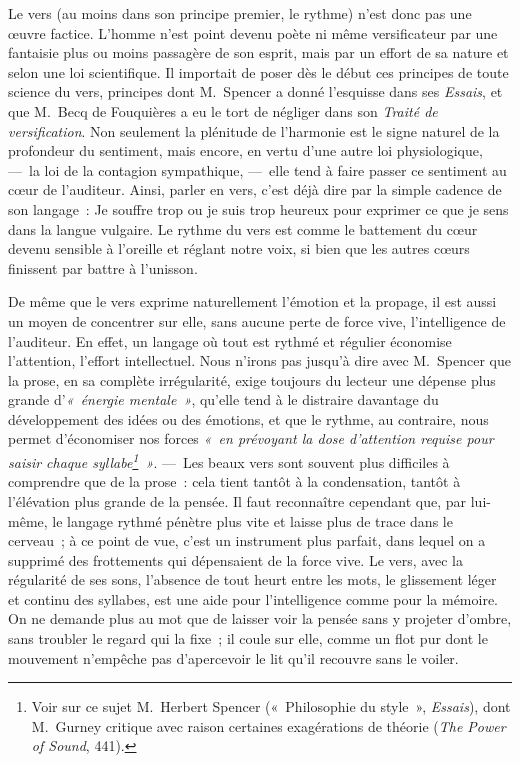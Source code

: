 \documentclass[french,twoside]{book} %
\begin{document}
Le vers (au moins dans son principe premier, le rythme) n’est donc pas une œuvre factice. L’homme n’est point devenu poète ni même versificateur par une fantaisie plus ou moins passagère de son esprit, mais par un effort de sa nature et selon une loi scientifique. Il importait de poser dès le début ces principes de toute science du vers, principes dont M. Spencer a donné l’esquisse dans ses \emph{Essais}, et que M. Becq de Fouquières a eu le tort de négliger dans son \emph{Traité de versification}. Non seulement la plénitude de l’harmonie est le signe naturel de la profondeur du sentiment, mais encore, en vertu d’une autre loi physiologique,  — la loi de la contagion sympathique, — elle tend à faire passer ce sentiment au cœur de l’auditeur. Ainsi, parler en vers, c’est déjà dire par la simple cadence de son langage : Je souffre trop ou je suis trop heureux pour exprimer ce que je sens dans la langue vulgaire. Le rythme du vers est comme le battement du cœur devenu sensible à l’oreille et réglant notre voix, si bien que les autres cœurs finissent par battre à l’unisson.\par
De même que le vers exprime naturellement l’émotion et la propage, il est aussi un moyen de concentrer sur elle, sans aucune perte de force vive, l’intelligence de l’auditeur. En effet, un langage où tout est rythmé et régulier économise l’attention, l’effort intellectuel. Nous n’irons pas jusqu’à dire avec M. Spencer que la prose, en sa complète irrégularité, exige toujours du lecteur une dépense plus grande d’\emph{« énergie mentale »}, qu’elle tend à le distraire davantage du développement des idées ou des émotions, et que le rythme, au contraire, nous permet d’économiser nos forces \emph{« en prévoyant la dose d’attention requise pour saisir chaque syllabe\footnote{Voir sur ce sujet M. Herbert Spencer (« Philosophie du style », \emph{Essais}), dont M. Gurney critique avec raison certaines exagérations de théorie (\emph{The Power of Sound}, 441).} »}. — Les beaux vers sont souvent plus difficiles à comprendre que de la prose : cela tient tantôt à la condensation, tantôt à l’élévation plus grande de la pensée. Il faut reconnaître cependant que, par lui-même, le langage rythmé pénètre plus vite et laisse plus de trace dans le cerveau ; à ce point de vue, c’est un instrument plus parfait, dans lequel on a supprimé des  frottements qui dépensaient de la force vive. Le vers, avec la régularité de ses sons, l’absence de tout heurt entre les mots, le glissement léger et continu des syllabes, est une aide pour l’intelligence comme pour la mémoire. On ne demande plus au mot que de laisser voir la pensée sans y projeter d’ombre, sans troubler le regard qui la fixe ; il coule sur elle, comme un flot pur dont le mouvement n’empêche pas d’apercevoir le lit qu’il recouvre sans le voiler.\par
\end{document}
